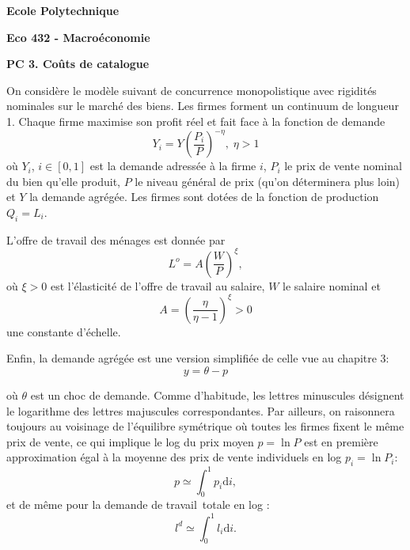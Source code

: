 \documentclass[11pt,a4paper]{article}
\begin{document}
\begin{center}
\textbf{Ecole Polytechnique}

\bigskip

\textbf{Eco 432 - Macro\'{e}conomie}

\bigskip

\textbf{PC 3. Co\^{u}ts de catalogue}

\hspace{1.0in}
\end{center}

\bigskip

On consid\`{e}re le mod\`{e}le suivant de concurrence monopolistique avec
rigidit\'{e}s nominales sur le march\'{e} des biens. Les firmes forment un
continuum de longueur 1. Chaque firme maximise son profit r\'{e}el et fait
face \`{a} la fonction de demande%
\begin{equation}
Y_{i}=Y\left( \frac{P_{i}}{P}\right) ^{-\eta },\;\eta >1
\label{Demande relative}
\end{equation}%
o\`{u} $Y_{i}$, $i\in \left[ 0,1\right] $ est la demande adress\'{e}e \`{a}
la firme $i$, $P_{i}$ le prix de vente nominal du bien qu'elle produit, $P$
le niveau g\'{e}n\'{e}ral de prix (qu'on d\'{e}terminera plus loin) et $Y$
la demande agr\'{e}g\'{e}e. Les firmes sont dot\'{e}es de la fonction de
production $Q_{i}=L_{i}$.

L'offre de travail des m\'{e}nages est donn\'{e}e par 
\begin{equation}
L^{o}=A\left( \frac{W}{P}\right) ^{\xi },  \label{Offre de travail}
\end{equation}%
o\`{u} $\xi >0$ est l'\'{e}lasticit\'{e} de l'offre de travail au salaire, $%
W $ le salaire nominal et%
\begin{equation*}
A=\left( \frac{\eta }{\eta -1}\right) ^{\xi }>0
\end{equation*}%
une constante d'\'{e}chelle. 

Enfin, la demande agr\'{e}g\'{e}e est une version simplifiée de celle vue au chapitre 3:%
\begin{equation}
y=\theta-p  \label{Demande agregee}
\end{equation}

où $\theta$ est un choc de demande. 
Comme d'habitude, les lettres minuscules d\'{e}signent le logarithme des
lettres majuscules correspondantes. Par ailleurs, on raisonnera toujours au
voisinage de l'\'{e}quilibre sym\'{e}trique o\`{u} toutes les firmes fixent
le m\^{e}me prix de vente, ce qui implique le log du prix moyen $p=\ln P$
est en premi\`{e}re approximation \'{e}gal \`{a} la moyenne des prix de
vente individuels en log $p_{i}=\ln P_{i}$:%
\begin{equation*}
p\simeq \int_{0}^{1}p_{i}\text{d}i,
\end{equation*}%
et de m\^{e}me pour la demande de travail\ totale en log :%
\begin{equation*}
l^{d}\simeq \int_{0}^{1}l_{i}\text{d}i.
\end{equation*}
\end{document}
